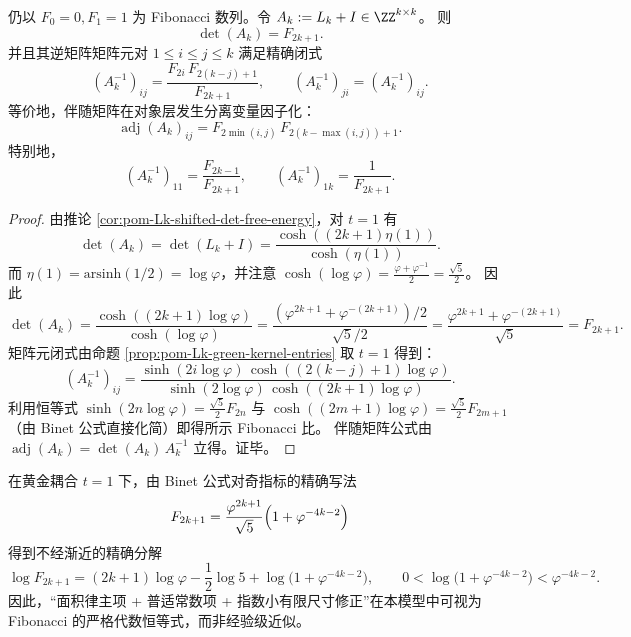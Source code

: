 \begin{corollary}\label{cor:pom-Lk-t1-fibonacci-det-green}
仍以 \(F_0=0,F_1=1\) 为 Fibonacci 数列。令 \(A_k:=L_k+I\in\ZZ^{k\times k}\)。
则
\[
\det(A_k)=F_{2k+1}.
\]
并且其逆矩阵矩阵元对 \(1\le i\le j\le k\) 满足精确闭式
\[
(A_k^{-1})_{ij}
=\frac{F_{2i}\,F_{2(k-j)+1}}{F_{2k+1}},
\qquad
(A_k^{-1})_{ji}=(A_k^{-1})_{ij}.
\]
等价地，伴随矩阵在对象层发生分离变量因子化：
\[
\operatorname{adj}(A_k)_{ij}=F_{2\min(i,j)}\,F_{2(k-\max(i,j))+1}.
\]
特别地，
\[
(A_k^{-1})_{11}=\frac{F_{2k-1}}{F_{2k+1}},
\qquad
(A_k^{-1})_{1k}=\frac{1}{F_{2k+1}}.
\]
\end{corollary}
\begin{proof}
由推论 \ref{cor:pom-Lk-shifted-det-free-energy}，对 \(t=1\) 有
\[
\det(A_k)=\det(L_k+I)=\frac{\cosh((2k+1)\eta(1))}{\cosh(\eta(1))}.
\]
而 \(\eta(1)=\mathrm{arsinh}(1/2)=\log\varphi\)，并注意 \(\cosh(\log\varphi)=\frac{\varphi+\varphi^{-1}}{2}=\frac{\sqrt5}{2}\)。
因此
\[
\det(A_k)=\frac{\cosh((2k+1)\log\varphi)}{\cosh(\log\varphi)}
=\frac{(\varphi^{2k+1}+\varphi^{-(2k+1)})/2}{\sqrt5/2}
=\frac{\varphi^{2k+1}+\varphi^{-(2k+1)}}{\sqrt5}
=F_{2k+1}.
\]
矩阵元闭式由命题 \ref{prop:pom-Lk-green-kernel-entries} 取 \(t=1\) 得到：
\[
(A_k^{-1})_{ij}
=\frac{\sinh(2i\log\varphi)\,\cosh((2(k-j)+1)\log\varphi)}{\sinh(2\log\varphi)\,\cosh((2k+1)\log\varphi)}.
\]
利用恒等式
\(
\sinh(2n\log\varphi)=\frac{\sqrt5}{2}F_{2n}
\)
与
\(
\cosh((2m+1)\log\varphi)=\frac{\sqrt5}{2}F_{2m+1}
\)
（由 Binet 公式直接化简）即得所示 Fibonacci 比。
伴随矩阵公式由 \(\operatorname{adj}(A_k)=\det(A_k)\,A_k^{-1}\) 立得。证毕。
\end{proof}

\begin{remark}\label{rem:pom-Lk-fibonacci-area-law-exact}
在黄金耦合 \(t=1\) 下，由 Binet 公式对奇指标的精确写法
\[
F_{2k+1}=\frac{\varphi^{2k+1}}{\sqrt5}\Bigl(1+\varphi^{-4k-2}\Bigr)
\]
得到不经渐近的精确分解
\[
\log F_{2k+1}=(2k+1)\log\varphi-\frac12\log 5+\log\bigl(1+\varphi^{-4k-2}\bigr),
\qquad
0<\log\bigl(1+\varphi^{-4k-2}\bigr)<\varphi^{-4k-2}.
\]
因此，“面积律主项 + 普适常数项 + 指数小有限尺寸修正”在本模型中可视为 Fibonacci 的严格代数恒等式，而非经验级近似。
\end{remark}

